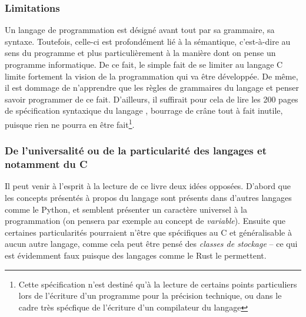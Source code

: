 \documentclass[../../main.tex]{subfiles}
\begin{document}
\subsubsection{Limitations}
Un langage de programmation est désigné avant tout par sa grammaire, sa syntaxe. Toutefois, celle-ci est profondément lié à la sémantique, c'est-à-dire au sens du programme et plus particulièrement à la manière dont on pense un programme informatique. De ce fait, le simple fait de se limiter au langage C limite fortement la vision de la programmation qui va être développée. De même, il est dommage de n'apprendre que les règles de grammaires du langage et penser savoir programmer de ce fait. D'ailleurs, il suffirait pour cela de lire les 200 pages de spécification syntaxique du langage \cite{c11}, bourrage de crâne tout à fait inutile, puisque rien ne pourra en être fait\footnote{Cette spécification n'est destiné qu'à la lecture de certains points particuliers lors de l'écriture d'un programme pour la précision technique, ou dans le cadre très spécfique de l'écriture d'un compilateur du langage}.
\subsubsection{De l'universalité ou de la particularité des langages et notamment du C}
Il peut venir à l'esprit à la lecture de ce livre deux idées opposées. D'abord que les concepts présentés à propos du langage sont présents dans d'autres langages comme le Python, et semblent présenter un caractère universel à la programmation (on pensera par exemple au concept de \textit{variable}). Ensuite que certaines particularités pourraient n'être que spécifiques au C et généralisable à aucun autre langage, comme cela peut être pensé des \textit{classes de stockage} -- ce qui est évidemment faux puisque des langages comme le Rust le permettent.
 
\end{document}
